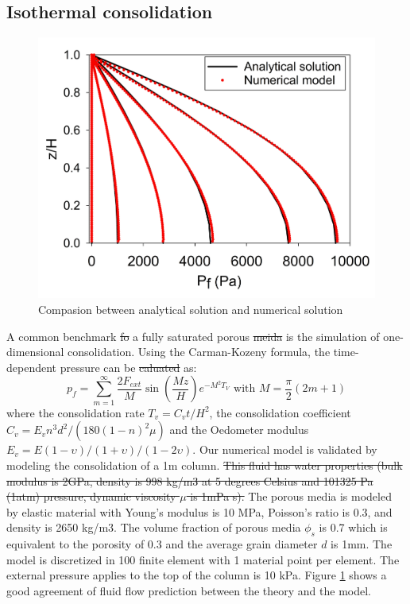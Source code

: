 \documentclass[preprint,12pt]{elsarticle}
\providecommand{\DIFadd}[1]{{\protect\color{blue}\uwave{#1}}} %
\providecommand{\DIFdel}[1]{{\protect\color{red}\sout{#1}}}                      %
\providecommand{\DIFaddbegin}{} %
\providecommand{\DIFaddend}{} %
\providecommand{\DIFdelbegin}{} %
\providecommand{\DIFdelend}{} %
\newcommand{\DIFscaledelfig}{0.5}
\newlength{\DIFdelgraphicswidth} %
\newlength{\DIFdelgraphicsheight} %
\newcommand{\DIFaddincludegraphics}[2][]{{\color{blue}\fbox{\DIFOincludegraphics[#1]{#2}}}} %
\newcommand{\DIFdelincludegraphics}[2][]{%
\sbox{\DIFdelgraphicsbox}{\DIFOincludegraphics[#1]{#2}}%
\settoboxwidth{\DIFdelgraphicswidth}{\DIFdelgraphicsbox} %
\settoboxtotalheight{\DIFdelgraphicsheight}{\DIFdelgraphicsbox} %
\scalebox{\DIFscaledelfig}{%
\parbox[b]{\DIFdelgraphicswidth}{\usebox{\DIFdelgraphicsbox}\\[-\baselineskip] \rule{\DIFdelgraphicswidth}{0em}}\llap{\resizebox{\DIFdelgraphicswidth}{\DIFdelgraphicsheight}{%
\setlength{\unitlength}{\DIFdelgraphicswidth}%
\begin{picture}(1,1)%
\thicklines\linethickness{2pt} %
{\color[rgb]{1,0,0}\put(0,0){\framebox(1,1){}}}%
{\color[rgb]{1,0,0}\put(0,0){\line( 1,1){1}}}%
{\color[rgb]{1,0,0}\put(0,1){\line(1,-1){1}}}%
\end{picture}%
}\hspace*{3pt}}} %
} %
\DeclareRobustCommand{\DIFaddbegin}{\DIFOaddbegin \let\includegraphics\DIFaddincludegraphics} %
\DeclareRobustCommand{\DIFaddend}{\DIFOaddend \let\includegraphics\DIFOincludegraphics} %
\DeclareRobustCommand{\DIFdelbegin}{\DIFOdelbegin \let\includegraphics\DIFdelincludegraphics} %
\DeclareRobustCommand{\DIFdelend}{\DIFOaddend \let\includegraphics\DIFOincludegraphics} %
\begin{document}
\subsection{\textsf{Isothermal consolidation}}
%
%
\begin{figure}[h]
\center
\includegraphics[scale=.3]{consolidation.jpg}
\caption{Compasion between analytical solution and numerical solution}
\label{fig:consolidation}
\end {figure}
%
%
A common benchmark \DIFdelbegin \DIFdel{fo }\DIFdelend \DIFaddbegin \DIFadd{for }\DIFaddend a fully saturated porous \DIFdelbegin \DIFdel{meida }\DIFdelend \DIFaddbegin \DIFadd{media }\DIFaddend is the simulation of one-dimensional consolidation. Using the Carman-Kozeny formula, the time-dependent pressure can be \DIFdelbegin \DIFdel{caluated }\DIFdelend \DIFaddbegin \DIFadd{calculated }\DIFaddend as:
%
%
\begin{equation}
  p_f  = \sum_{m=1}^{\infty} \frac{2F_{ext}}{M} \sin (\frac{Mz}{H}) e^{-M^2T_V} \textrm{    with    }   M = \frac{\pi}{2} (2m+1)
\end {equation}
%
%
where the consolidation rate $T_v =C_vt/H^2$, the consolidation coefficient $C_v = E_v n^3 d^2/(180(1-n)^2\mu) $ and the Oedometer modulus $E_v = E(1-\upsilon)/(1+\upsilon)/(1-2\upsilon)$.
Our numerical model is validated by modeling the consolidation of a 1m column. \DIFdelbegin \DIFdel{This fluid has water properties (bulk modulus is 2GPa, density is 998 kg/m3 at 5 degrees Celsius and 101325 Pa (1atm) pressure, dynamic viscosity $\mu$ is 1mPa s). }\DIFdelend The porous media is modeled by elastic material with Young's modulus is 10 MPa, Poisson's ratio is 0.3, and density is 2650 kg/m3. The volume fraction of porous media $\phi_s$ is 0.7 which is equivalent to the porosity of 0.3 and the average grain diameter $d$ is 1mm. The model is discretized in 100 finite element with 1 material point per element. The external pressure applies to the top of the column is 10 kPa. Figure \ref{fig:consolidation} shows a good agreement of fluid flow prediction between the theory and the model.
\DIFdelbegin %
\DIFdelend %
\end{document}
